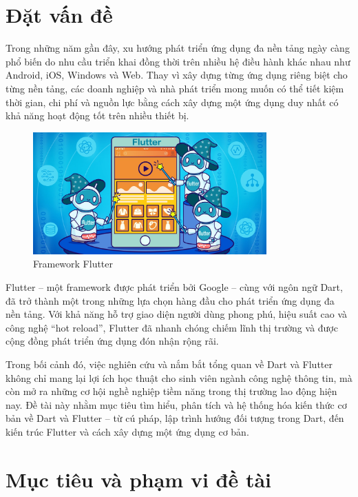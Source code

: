 \section{Đặt vấn đề}
\label{section:1.1}

Trong những năm gần đây, xu hướng phát triển ứng dụng đa nền tảng ngày càng phổ biến do nhu cầu triển khai đồng thời trên nhiều hệ điều hành khác nhau như Android, iOS, Windows và Web. Thay vì xây dựng từng ứng dụng riêng biệt cho từng nền tảng, các doanh nghiệp và nhà phát triển mong muốn có thể tiết kiệm thời gian, chi phí và nguồn lực bằng cách xây dựng một ứng dụng duy nhất có khả năng hoạt động tốt trên nhiều thiết bị. 

\begin{figure}[H]
    \centering
    \includegraphics[width=0.8\textwidth]{Hinhve/Chuong1/flutter_image.jpeg}
    \caption{Framework Flutter}
    \label{fig:flutterimageintro}
\end{figure}

Flutter – một framework được phát triển bởi Google – cùng với ngôn ngữ Dart, đã trở thành một trong những lựa chọn hàng đầu cho phát triển ứng dụng đa nền tảng. Với khả năng hỗ trợ giao diện người dùng phong phú, hiệu suất cao và công nghệ “hot reload”, Flutter đã nhanh chóng chiếm lĩnh thị trường và được cộng đồng phát triển ứng dụng đón nhận rộng rãi.

Trong bối cảnh đó, việc nghiên cứu và nắm bắt tổng quan về Dart và Flutter không chỉ mang lại lợi ích học thuật cho sinh viên ngành công nghệ thông tin, mà còn mở ra những cơ hội nghề nghiệp tiềm năng trong thị trường lao động hiện nay. Đề tài này nhằm mục tiêu tìm hiểu, phân tích và hệ thống hóa kiến thức cơ bản về Dart và Flutter – từ cú pháp, lập trình hướng đối tượng trong Dart, đến kiến trúc Flutter và cách xây dựng một ứng dụng cơ bản.

\section{Mục tiêu và phạm vi đề tài}
\label{section:1.2}

